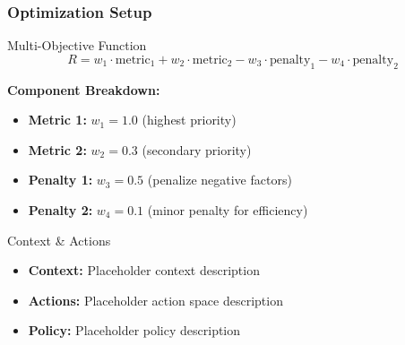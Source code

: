\begin{frame}
\frametitle{Optimization Setup}
\begin{block}{Multi-Objective Function}
\[
R = w_1 \cdot \mathrm{metric}_1 + w_2 \cdot \mathrm{metric}_2 - w_3 \cdot \mathrm{penalty}_1 - w_4 \cdot \mathrm{penalty}_2
\]

\textbf{Component Breakdown:}
\begin{itemize}
\item \textbf{Metric 1:} $w_1 = 1.0$ (highest priority)
\item \textbf{Metric 2:} $w_2 = 0.3$ (secondary priority)
\item \textbf{Penalty 1:} $w_3 = 0.5$ (penalize negative factors)
\item \textbf{Penalty 2:} $w_4 = 0.1$ (minor penalty for efficiency)
\end{itemize}
\end{block}

\begin{block}{Context \& Actions}
\begin{itemize}
\item \textbf{Context:} Placeholder context description
\item \textbf{Actions:} Placeholder action space description
\item \textbf{Policy:} Placeholder policy description
\end{itemize}
\end{block}
\end{frame}

